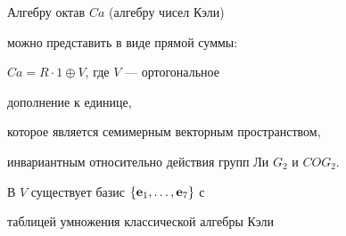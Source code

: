 

\maketitle


\label{begin}








Алгебру октав $Ca$ (алгебру чисел Кэли)


можно представить в виде прямой суммы:


$Ca=R\cdot 1\oplus V$, где $V$ --- ортогональное


дополнение к единице,


которое является семимерным векторным пространством,


инвариантным относительно действия групп Ли $G_2$ и $COG_2$.


В $V$ существует базис $ \{\bold{e}_{1},\dotsc,\bold{e}_{7}\}$ с


таблицей умножения классической алгебры Кэли \cite{2}


